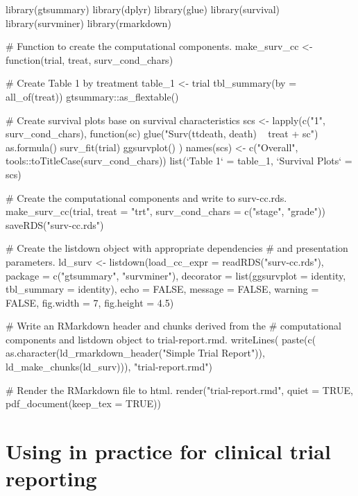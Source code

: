 \begin{Schunk}
\begin{Sinput}
library(gtsummary)
library(dplyr)
library(glue)
library(survival)
library(survminer)
library(rmarkdown)

# Function to create the computational components.
make_surv_cc <- function(trial, treat, surv_cond_chars) {
  # Create Table 1 by treatment
  table_1 <- trial %>%
    tbl_summary(by = all_of(treat)) %>%
    gtsummary::as_flextable()

  # Create survival plots base on survival characteristics
  scs <- lapply(c("1", surv_cond_chars),
                function(sc) {
                  glue("Surv(ttdeath, death) ~ {treat} + {sc}") %>%
                    as.formula() %>%
                    surv_fit(trial) %>%
                    ggsurvplot()
                })
  names(scs) <- c("Overall", tools::toTitleCase(surv_cond_chars))
  list(`Table 1` = table_1, `Survival Plots` = scs)
}

# Create the computational components and write to surv-cc.rds.
make_surv_cc(trial, treat = "trt",
             surv_cond_chars = c("stage", "grade")) %>%
  saveRDS("surv-cc.rds")

# Create the listdown object with appropriate dependencies
# and presentation parameters.
ld_surv <- listdown(load_cc_expr = readRDS("surv-cc.rds"),
                    package = c("gtsummary", "survminer"),
                    decorator = list(ggsurvplot = identity,
                                     tbl_summary = identity),
                    echo = FALSE,
                    message = FALSE,
                    warning = FALSE,
                    fig.width = 7,
                    fig.height = 4.5)

# Write an RMarkdown header and chunks derived from the 
# computational components and listdown object to trial-report.rmd.
writeLines(
  paste(c(
    as.character(ld_rmarkdown_header("Simple Trial Report")),
    ld_make_chunks(ld_surv))),
  "trial-report.rmd")

# Render the RMarkdown file to html.
render("trial-report.rmd", quiet = TRUE, pdf_document(keep_tex = TRUE))  
\end{Sinput}
\end{Schunk}

\hypertarget{using-in-practice-for-clinical-trial-reporting}{%
\section{\texorpdfstring{Using  in practice for clinical
trial
reporting}{Using  in practice for clinical trial reporting}}\label{using-in-practice-for-clinical-trial-reporting}}

